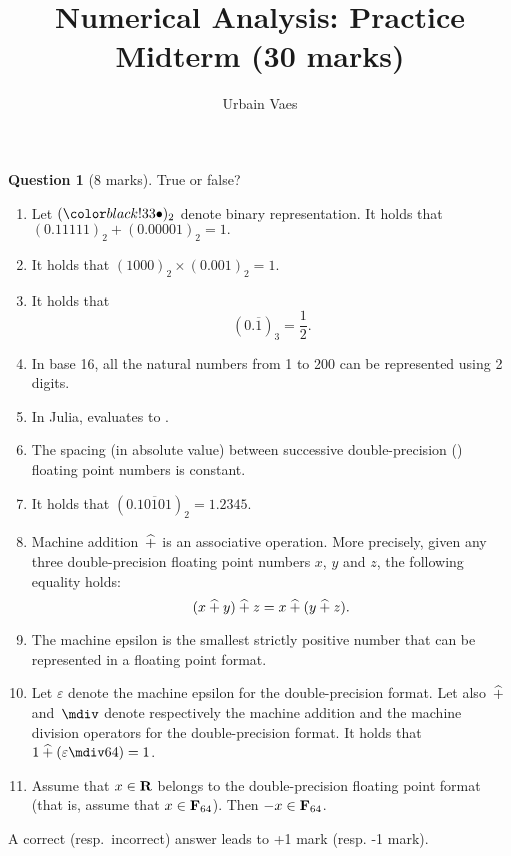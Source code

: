 \documentclass[11pt]{article}
\theoremstyle{definition}
\newtheorem{question}{Question}
\begin{document}
\title{Numerical Analysis: Practice Midterm (30 marks)}
\author{Urbain Vaes}
\maketitle

\begin{question}
    [8 marks]
    True or false?
    \begin{enumerate}
        \item Let $(\placeholder)_2$ denote binary representation.
            It holds that
            \(
                (0.11111)_2 + (0.00001)_2 = 1.
            \)
        \item It holds that
            \(
                (1000)_2 \times (0.001)_2 = 1.
            \)
        \item It holds that
            \[
                (0.\overline{1})_3 = \frac{1}{2}.
            \]
        \item In base 16, all the natural numbers from 1 to 200 can be represented using 2 digits.
        \item In Julia,  evaluates to .
        \item The spacing (in absolute value) between successive double-precision () floating point numbers is constant.
        \item It holds that $(0.\overline{10101})_2 = 1.2345$.
        \item Machine addition~$\mathbin{\widehat +}$ is an associative operation.
            More precisely, given any three double-precision floating point numbers $x$, $y$ and $z$,
            the following equality holds:
            \[
                (x \mathbin{\widehat +} y) \mathbin{\widehat +} z = x \mathbin{\widehat +} (y \mathbin{\widehat +} z).
            \]
        \item
            The machine epsilon is the smallest strictly positive number that can be represented in a floating point format.

        \item
            Let $\varepsilon$ denote the machine epsilon for the double-precision format.
            Let also~$\mathbin{\widehat +}$ and~$\mdiv$ denote respectively the machine addition and the machine division operators for the double-precision format.
            It holds that $1 \madd (\varepsilon \mdiv 64) = 1$.

        \item
            Assume that $x \in \mathbf R$ belongs to the double-precision floating point format (that is,
            assume that $x \in \mathbf F_{64}$).
            Then $-x \in \mathbf F_{64}$.
    \end{enumerate}
    A correct (resp.~incorrect) answer leads to +1 mark (resp. -1 mark).
\end{question}
\end{document}
